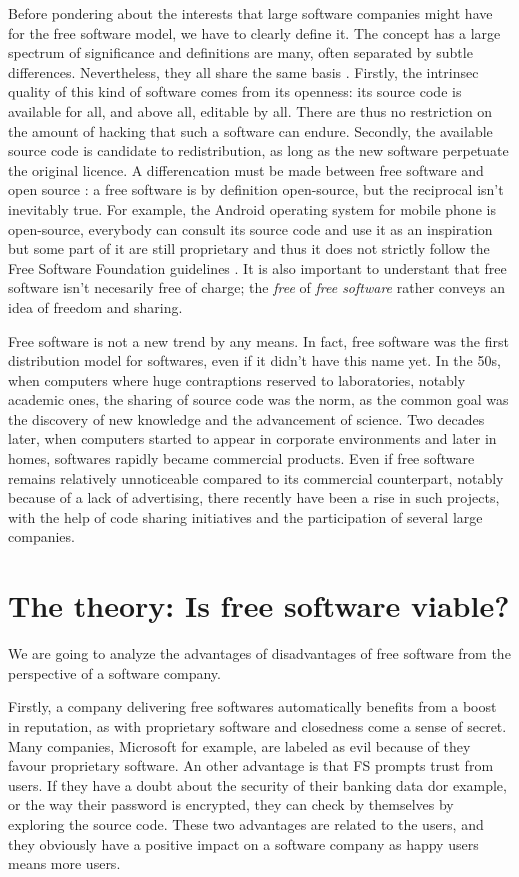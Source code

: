 \documentclass[12pt]{article}
\begin{document}
Before pondering about the interests that large software companies
might have for the free software model, we have to clearly define
it. The concept has a large spectrum of significance and definitions
are many, often separated by subtle differences. Nevertheless, they
all share the same basis \cite{sers}. Firstly, the intrinsec quality
of this kind of software comes from its openness: its source code is
available for all, and above all, editable by all. There are thus no
restriction on the amount of hacking that such a software can endure. Secondly,
the available source code is candidate to redistribution, as long as
the new software perpetuate the original licence. A differencation must
be made between free software and open source : a free software is by
definition open-source, but the reciprocal isn't inevitably true. For
example, the Android operating system for mobile phone is open-source,
everybody can consult its source code and use it as an
inspiration but some part of it are still proprietary and thus it does not strictly follow the
Free Software Foundation guidelines \cite{and}. It is also important to understant that free software isn't
necesarily free of charge; the \textit{free} of \textit{free software} rather conveys an idea of freedom and sharing.

Free software is not a new trend by any means. In fact, free software
was the first distribution model for softwares, even if it didn't have
this name yet. In the 50s, when computers where huge contraptions
reserved to laboratories, notably academic ones, the sharing of source
code was the norm, as the common goal was the discovery of new knowledge and the
advancement of science. Two decades later, when computers started to
appear in corporate environments and later in homes, softwares rapidly
became commercial products. Even if free software remains relatively unnoticeable
compared to its commercial counterpart, notably because of a lack of advertising, there recently have been a
rise in such projects, with the help of code sharing initiatives and
the participation of several large companies.

\section{The theory: Is free software viable?}

We are going to analyze the advantages of disadvantages of free software from the perspective of 
a software company.

Firstly, a company delivering free softwares automatically benefits from a
boost in reputation, as with proprietary software and closedness come
a sense of secret. Many companies, Microsoft for example, are labeled
as evil because of they favour proprietary software. An other advantage is that FS prompts
trust from users. If they have a doubt about the security of their
banking data dor example, or the way their password is encrypted, they
can check by themselves by exploring the source code. These two advantages are related to the users, and they obviously
have a positive impact on a software company as happy users means
more users.
\end{document}
